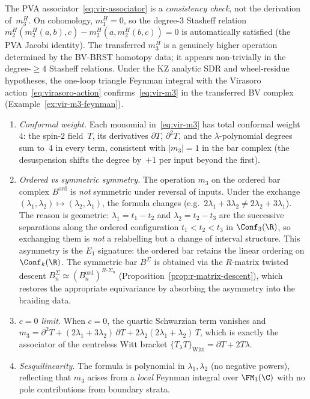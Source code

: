 \begin{remark}
\label{rem:vir-m3-transfer-method}
The PVA associator~\eqref{eq:vir-associator} is a \emph{consistency check}, not the derivation of~$m_3^H$. On cohomology, $m_1^H = 0$, so the degree-$3$ Stasheff relation
$m_2^H(m_2^H(a,b),c) - m_2^H(a,m_2^H(b,c)) = 0$
is automatically satisfied (the PVA Jacobi identity).
The transferred $m_3^H$ is a genuinely higher operation
determined by the BV-BRST homotopy data;
it appears non-trivially in the degree-$\ge 4$ Stasheff relations.
Under the KZ analytic SDR and wheel-residue hypotheses, the one-loop
triangle Feynman integral with the Virasoro action~\eqref{eq:virasoro-action}
confirms~\eqref{eq:vir-m3} in the transferred BV complex
(Example~\ref{ex:vir-m3-feynman}).
\end{remark}

\begin{remark}
\label{rem:m3-checks}
\leavevmode
\begin{enumerate}
\item \emph{Conformal weight.} Each monomial in~\eqref{eq:vir-m3}
 has total conformal weight~$4$: the spin-$2$ field~$T$,
 its derivatives $\partial T$, $\partial^2 T$, and the
 $\lambda$-polynomial degrees sum to~$4$ in every term,
 consistent with $|m_3| = 1$ in the bar complex
 (the desuspension shifts the degree by~$+1$ per input beyond the first).
\item \emph{Ordered vs symmetric symmetry.} The operation $m_3$
 on the ordered bar complex $B^{\mathrm{ord}}$ is \emph{not}
 symmetric under reversal of inputs. Under the exchange
 $(\lambda_1, \lambda_2) \mapsto (\lambda_2, \lambda_1)$,
 the formula changes (e.g.\ $2\lambda_1 + 3\lambda_2 \ne
 2\lambda_2 + 3\lambda_1$). The reason is geometric:
 $\lambda_1 = t_1 - t_2$ and $\lambda_2 = t_2 - t_3$ are
 the successive separations along the ordered configuration
 $t_1 < t_2 < t_3$ in $\Conf_3(\R)$, so exchanging them
 is \emph{not} a relabelling but a change of interval
 structure. This asymmetry is the $E_1$ signature: the
 ordered bar retains the linear ordering on $\Conf_k(\R)$.
 The symmetric bar $B^{\Sigma}$ is obtained via the
 $R$-matrix twisted descent
 $B^{\Sigma}_n \simeq (B^{\mathrm{ord}}_n)^{R\text{-}\Sigma_n}$
 (Proposition~\ref{prop:r-matrix-descent}), which restores
 the appropriate equivariance by absorbing the asymmetry
 into the braiding data.
\item \emph{$c = 0$ limit.} When $c = 0$, the quartic Schwarzian
 term vanishes and $m_3 = \partial^2 T +
 (2\lambda_1 + 3\lambda_2)\,\partial T +
 2\lambda_2(2\lambda_1 + \lambda_2)\,T$, which is exactly the
 associator of the centreless Witt bracket
 $\{T_\lambda T\}_{\text{Witt}} = \partial T + 2T\lambda$.
\item \emph{Sesquilinearity.} The formula is polynomial
 in $\lambda_1, \lambda_2$ (no negative powers), reflecting
 that $m_3$ arises from a \emph{local} Feynman integral over
 $\FM_3(\C)$ with no pole contributions from boundary strata.
\end{enumerate}
\end{remark}

